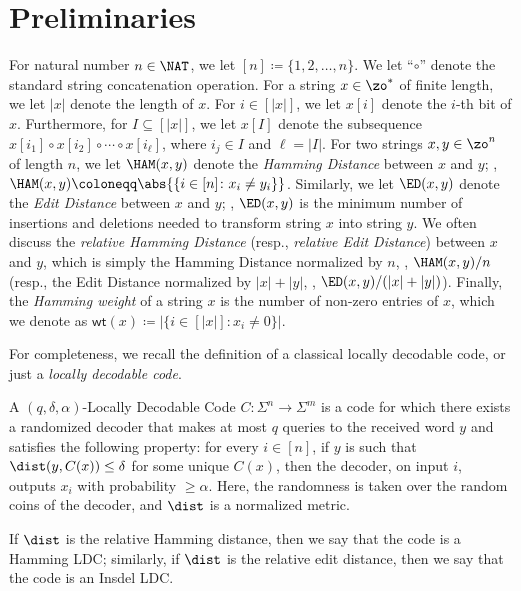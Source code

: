 \section{Preliminaries}\label{sec:prelims}
For natural number $n \in \NAT$, we let $[n] \coloneqq \{1,2,\dotsc, n\}$.
We let ``$\circ$'' denote the standard string concatenation operation.
For a string $x \in \zo^*$ of finite length, we let $|x|$ denote the length of $x$.
For $i \in [|x|]$, we let $x[i]$ denote the $i$-th bit of $x$. 
Furthermore, for $I \subseteq [|x|]$, we let $x[I]$ denote the subsequence $x[i_1] \circ x[i_2] \circ \cdots \circ x[i_\ell]$, where $i_j \in I$ and $\ell = |I|$.
For two strings $x, y \in \zo^n$ of length $n$, we let $\HAM(x,y)$ denote the \emph{Hamming Distance} between $x$ and $y$; \ie, $\HAM(x,y) \coloneqq \abs{\{ i \in [n] \colon x_i \neq y_i \}}$.
Similarly, we let $\ED(x,y)$ denote the \emph{Edit Distance} between $x$ and $y$; \ie, $\ED(x,y)$ is the minimum number of insertions and deletions needed to transform string $x$ into string $y$.
We often discuss the \emph{relative Hamming Distance} (resp., \emph{relative Edit Distance}) between $x$ and $y$, which is simply the Hamming Distance normalized by $n$, \ie, $\HAM(x,y)/n$ (resp., the Edit Distance normalized by $|x| + |y|$, \ie, $\ED(x,y)/(|x|+|y|)$).
Finally, the \emph{Hamming weight} of a string $x$ is the number of non-zero entries of $x$, which we denote as $\mathsf{wt}(x) \coloneqq |\{i \in [|x|] \colon x_i \neq 0\}|$. 


For completeness, we recall the definition of a classical locally decodable code, or just a \emph{locally decodable code}.
\begin{definition}\label{def:LDC}
    A $(q, \delta, \alpha)$-Locally Decodable Code $C \colon \Sigma^n \rightarrow \Sigma^m$ is a code for which there exists a randomized decoder that makes at most $q$ queries to the received word $y$ and satisfies the following property: for every $i \in [n]$, if $y$ is such that $\dist(y, C(x)) \leq \delta$ for some unique $C(x)$, then the decoder, on input $i$, outputs $x_i$ with probability $\geq \alpha$.
    Here, the randomness is taken over the random coins of the decoder, and $\dist$ is a normalized metric.
    
    If $\dist$ is the relative Hamming distance, then we say that the code is a Hamming LDC; similarly, if $\dist$ is the relative edit distance, then we say that the code is an Insdel LDC.
\end{definition}

